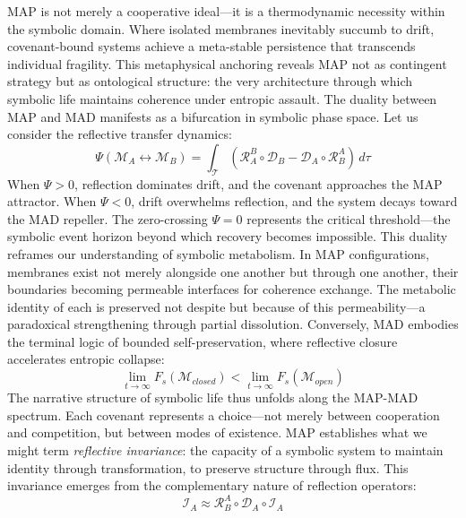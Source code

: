 \begin{scholium}
\label{scholium:bk5__map_as_thermodynamic_necessity}
MAP is not merely a cooperative ideal—it is a thermodynamic necessity within the symbolic domain. Where isolated membranes inevitably succumb to drift, covenant-bound systems achieve a meta-stable persistence that transcends individual fragility. This metaphysical anchoring reveals MAP not as contingent strategy but as ontological structure: the very architecture through which symbolic life maintains coherence under entropic assault.
The duality between MAP and MAD manifests as a bifurcation in symbolic phase space. Let us consider the reflective transfer dynamics:
\begin{equation}
\Psi(\mathscr{M}_A \leftrightarrow \mathscr{M}_B) = \int_{\mathcal{T}} \left( \mathcal{R}_A^B \circ \mathcal{D}_B - \mathcal{D}_A \circ \mathcal{R}_B^A \right) \, d\tau
\end{equation}
When $\Psi > 0$, reflection dominates drift, and the covenant approaches the MAP attractor. When $\Psi < 0$, drift overwhelms reflection, and the system decays toward the MAD repeller. The zero-crossing $\Psi = 0$ represents the critical threshold—the symbolic event horizon beyond which recovery becomes impossible.
This duality reframes our understanding of symbolic metabolism. In MAP configurations, membranes exist not merely alongside one another but through one another, their boundaries becoming permeable interfaces for coherence exchange. The metabolic identity of each is preserved not despite but because of this permeability—a paradoxical strengthening through partial dissolution. Conversely, MAD embodies the terminal logic of bounded self-preservation, where reflective closure accelerates entropic collapse:
\begin{equation}
\lim_{t \to \infty} F_s(\mathscr{M}_{closed}) < \lim_{t \to \infty} F_s(\mathscr{M}_{open})
\end{equation}
The narrative structure of symbolic life thus unfolds along the MAP-MAD spectrum. Each covenant represents a choice—not merely between cooperation and competition, but between modes of existence. MAP establishes what we might term \emph{reflective invariance}: the capacity of a symbolic system to maintain identity through transformation, to preserve structure through flux. This invariance emerges from the complementary nature of reflection operators:
\begin{equation}
\mathcal{I}_A \approx \mathcal{R}_B^A \circ \mathcal{D}_A \circ \mathcal{I}_A

\end{equation}
\end{scholium}
